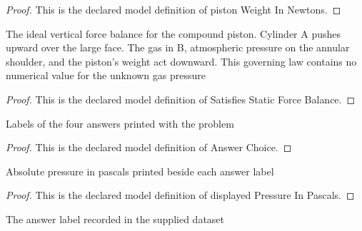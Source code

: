 \begin{proof}
  This is the declared model definition of piston Weight In Newtons.
\end{proof}
\begin{definition}
  \label{def:physics:phyx-mini-0395:phyxminiproblems-problemphyxmini0395-satisfiesstaticforcebalance}
  The ideal vertical force balance for the compound piston. Cylinder A pushes upward over the large face. The gas in B, atmospheric pressure on the annular shoulder, and the piston's weight act downward. This governing law contains no numerical value for the unknown gas pressure
\end{definition}
\begin{proof}
  This is the declared model definition of Satisfies Static Force Balance.
\end{proof}
\begin{definition}
  \label{def:physics:phyx-mini-0395:phyxminiproblems-problemphyxmini0395-answerchoice}
  Labels of the four answers printed with the problem
\end{definition}
\begin{proof}
  This is the declared model definition of Answer Choice.
\end{proof}
\begin{definition}
  \label{def:physics:phyx-mini-0395:phyxminiproblems-problemphyxmini0395-displayedpressureinpascals}
  Absolute pressure in pascals printed beside each answer label
\end{definition}
\begin{proof}
  This is the declared model definition of displayed Pressure In Pascals.
\end{proof}
\begin{definition}
  \label{def:physics:phyx-mini-0395:phyxminiproblems-problemphyxmini0395-recordedanswerchoice}
  The answer label recorded in the supplied dataset
\end{definition}
